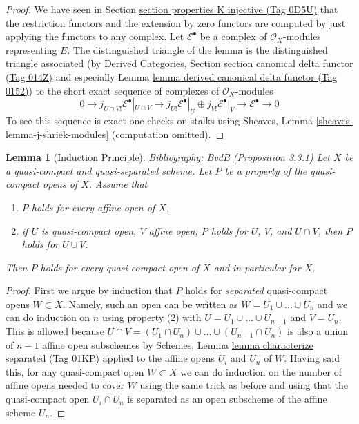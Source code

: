 \documentclass{amsart}
\newenvironment{reference}{\comment}{\endcomment}
\theoremstyle{plain}
\newtheorem{lemma}[subsection]{Lemma}
\theoremstyle{definition}
\theoremstyle{remark}
\numberwithin{equation}{subsection}
\begin{document}
\begin{proof}
We have seen in Section \href{https://stacks.math.columbia.edu/tag/0D5U}{section properties K injective (Tag 0D5U)}
that the restriction functors and the extension
by zero functors are computed by just applying the functors to
any complex. Let $\mathcal{E}^\bullet$ be a complex of $\mathcal{O}_X$-modules
representing $E$. The distinguished triangle of the lemma is the
distinguished triangle associated (by
Derived Categories, Section
\href{https://stacks.math.columbia.edu/tag/014Z}{section canonical delta functor (Tag 014Z)} and especially
Lemma \href{https://stacks.math.columbia.edu/tag/0152}{lemma derived canonical delta functor (Tag 0152)})
to the short exact sequence of complexes of $\mathcal{O}_X$-modules
$$
0 \to j_{U \cap V!}\mathcal{E}^\bullet|_{U \cap V} \to
j_{U!}\mathcal{E}^\bullet|_U \oplus j_{V!}\mathcal{E}^\bullet|_V
\to \mathcal{E}^\bullet \to 0
$$
To see this sequence is exact one checks on stalks using
Sheaves, Lemma \ref{sheaves-lemma-j-shriek-modules}
(computation omitted).
\end{proof}


\begin{lemma}[Induction Principle]
\label{coherent-lemma-induction-principle}
\begin{reference}
\href{https://stacks.math.columbia.edu/bibliography}{Bibliography: BvdB (Proposition 3.3.1)}
\end{reference}
Let $X$ be a quasi-compact and quasi-separated scheme. Let $P$ be a property
of the quasi-compact opens of $X$. Assume that
\begin{enumerate}
\item $P$ holds for every affine open of $X$,
\item if $U$ is quasi-compact open, $V$ affine open,
$P$ holds for $U$, $V$, and $U \cap V$, then
$P$ holds for $U \cup V$.
\end{enumerate}
Then $P$ holds for every quasi-compact open of $X$
and in particular for $X$.
\end{lemma}

\begin{proof}
First we argue by induction that $P$ holds for {\it separated} quasi-compact
opens $W \subset X$. Namely, such an open can be written as
$W = U_1 \cup \ldots \cup U_n$ and we can do induction on $n$ using
property (2) with $U = U_1 \cup \ldots \cup U_{n - 1}$ and $V = U_n$.
This is allowed because
$U \cap V = (U_1 \cap U_n) \cup \ldots \cup (U_{n - 1} \cap U_n)$
is also a union of $n - 1$ affine open subschemes by
Schemes, Lemma \href{https://stacks.math.columbia.edu/tag/01KP}{lemma characterize separated (Tag 01KP)}
applied to the affine opens $U_i$ and $U_n$ of $W$.
Having said this, for any quasi-compact open $W \subset X$ we can
do induction on the number of affine opens needed to cover $W$
using the same trick as before and using that the quasi-compact open
$U_i \cap U_n$ is separated as an open subscheme of the affine scheme $U_n$.
\end{proof}
\end{document}
